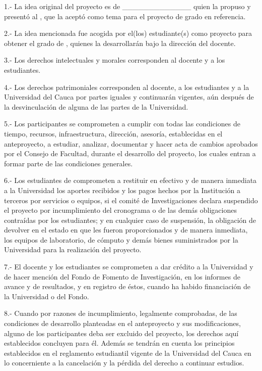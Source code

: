1.- La idea original del proyecto es de \_\_\_\_\_\_\_\_\_\_\_\_\_ quien la propuso y presentó al \mydepartment{}, que la aceptó como tema para el proyecto de grado en referencia.

2.- La idea mencionada fue acogida por el(los)  estudiante(s) como proyecto para obtener el grado de \mydegree{}, quienes la desarrollarán bajo la dirección del docente.

3.- Los derechos intelectuales y morales corresponden al docente y a los estudiantes.

4.- Los derechos patrimoniales corresponden al docente, a los estudiantes y a la Universidad del Cauca por partes iguales y continuarán vigentes, aún después de la desvinculación de alguna de las partes de la Universidad.

5.- Los participantes se comprometen a cumplir con todas las condiciones de tiempo, recursos, infraestructura, dirección, asesoría, establecidas en el anteproyecto, a estudiar, analizar, documentar y hacer acta de cambios aprobados por el Consejo de Facultad, durante el desarrollo del proyecto, los cuales entran a formar parte de las condiciones generales.

6.- Los estudiantes de comprometen a restituir en efectivo y de manera inmediata a la Universidad los aportes recibidos y los pagos hechos por la Institución  a terceros por servicios o equipos, si el comité de Investigaciones declara suspendido el proyecto por incumplimiento del cronograma o de las demás obligaciones contraídas por los estudiantes; y en cualquier caso de suspensión, la obligación de devolver en el estado en que les fueron proporcionados y de manera inmediata, los equipos de laboratorio, de cómputo y demás bienes suministrados por la Universidad para la realización del proyecto.

7.- El docente y los estudiantes se comprometen a dar crédito a la Universidad y de hacer mención del Fondo de Fomento de Investigación, en los informes de avance y de resultados, y en registro de éstos, cuando ha habido financiación de la Universidad o del Fondo.

8.- Cuando por razones de incumplimiento, legalmente comprobadas, de las condiciones de desarrollo planteadas en el anteproyecto y sus modificaciones, alguno de los participantes deba ser excluido del proyecto, los derechos aquí establecidos concluyen para él.  Además se tendrán en cuenta los principios establecidos en el reglamento estudiantil vigente de la Universidad del Cauca en lo concerniente a la cancelación y la pérdida del derecho a continuar estudios. 

